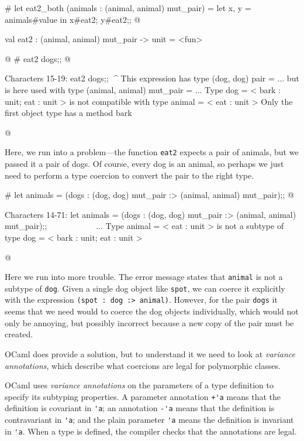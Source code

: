 \begin{ocaml}
# let eat2_both (animals : (animal, animal) mut_pair) =
     let x, y = animals#value in x#eat2; y#eat2;;
@
\begin{topoutput}
val eat2 : (animal, animal) mut_pair -> unit = <fun>
\end{topoutput}
@
# eat2 dogs;;
@
\begin{toperror}
Characters 15-19:
  eat2 dogs;;
                 ^^^^
This expression has type
  (dog, dog) pair = ...
but is here used with type
  (animal, animal) mut_pair = ...
Type dog = < bark : unit; eat : unit > is not compatible with type
  animal = < eat : unit > 
Only the first object type has a method bark
\end{toperror}
@
\end{ocaml}
%
Here, we run into a problem---the function \hbox{\lstinline$eat2$}
expects a pair of animals, but we passed it a pair of dogs.  Of
course, every dog is an animal, so perhaps we just need to perform a
type coercion to convert the pair to the right type.

\begin{ocaml}
# let animals = (dogs : (dog, dog) mut_pair :> (animal, animal) mut_pair);;
@
\begin{toperror}
Characters 14-71:
  let animals = (dogs : (dog, dog) mut_pair :> (animal, animal) mut_pair);;
                ^^^^^^^^^^^^^^^^^^^^^^^^^^^^^^^^^^^^^^^^^^^^^^^^^^^^^^^^^
...
Type animal = < eat : unit > is not a subtype of type
  dog = < bark : unit; eat : unit > 
\end{toperror}
@
\end{ocaml}
%
Here we run into more trouble.  The error message states
that \hbox{\lstinline$animal$} is not a subtype
of \hbox{\lstinline$dog$}.  Given a single dog object
like \hbox{\lstinline$spot$}, we can coerce it explicitly with the expression
\hbox{\lstinline$(spot : dog :> animal)$}. 
However, for the pair \hbox{\lstinline$dogs$} it seems that we need
would to coerce the dog objects individually, which would not only be
annoying, but possibly incorrect because a new copy of the pair must
be created.

OCaml does provide a solution, but to understand it we need to look at \emph{variance annotations},
which describe what coercions are legal for polymorphic classes.


OCaml uses \emph{variance annotations} on the parameters of a type
definition to specify its subtyping properties.  A parameter
annotation \hbox{\lstinline$+'a$} means that the definition is
covariant in \hbox{\lstinline$'a$}; an
annotation \hbox{\lstinline$-'a$} means that the definition is
contravariant in \hbox{\lstinline$'a$}; and the plain
parameter \hbox{\lstinline$'a$} means the definition is invariant
in \hbox{\lstinline$'a$}.  When a type is defined, the compiler checks
that the annotations are legal.

